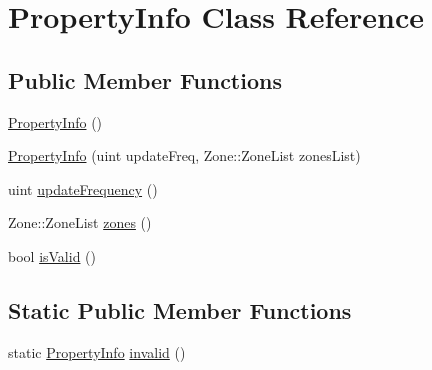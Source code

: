 \hypertarget{classPropertyInfo}{\section{Property\+Info Class Reference}
\label{classPropertyInfo}
}
\subsection*{Public Member Functions}
\begin{DoxyCompactItemize}
\item 
\hyperlink{classPropertyInfo_aec9353196a1c2bbebd516e0f548e15ad}{Property\+Info} ()
\item 
\hyperlink{classPropertyInfo_aca0b540318420cc779cba04c9fc49b70}{Property\+Info} (uint update\+Freq, Zone\+::\+Zone\+List zones\+List)
\item 
uint \hyperlink{classPropertyInfo_a8e6740dabbdea52c6b0900549c109963}{update\+Frequency} ()
\item 
Zone\+::\+Zone\+List \hyperlink{classPropertyInfo_ab0743a56cb3e6c0ed9dc959f3e388bee}{zones} ()
\item 
bool \hyperlink{classPropertyInfo_a574538766c305b7303a0d5721a0fd0d1}{is\+Valid} ()
\end{DoxyCompactItemize}
\subsection*{Static Public Member Functions}
\begin{DoxyCompactItemize}
\item 
static \hyperlink{classPropertyInfo}{Property\+Info} \hyperlink{classPropertyInfo_a5a3e9a1198ac54a40b1f3ae009bb1397}{invalid} ()
\end{DoxyCompactItemize}


